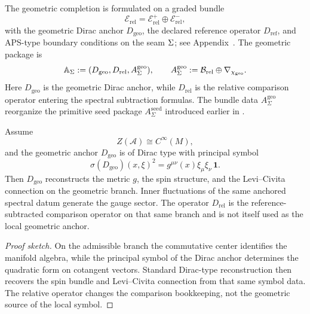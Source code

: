 The geometric completion is formulated on a graded bundle
\[
\mathcal E_{\mathrm{rel}}=\mathcal E_{\mathrm{rel}}^+\oplus\mathcal E_{\mathrm{rel}}^-,
\]
with the geometric Dirac anchor $D_{\mathrm{geo}}$, the declared reference operator
$D_{\mathrm{ref}}$, and APS-type boundary conditions on the seam $\Sigma$; see
Appendix~. The geometric package is
\[
\mathbb A_{\Sigma}:=(D_{\mathrm{geo}},D_{\mathrm{rel}},A_{\Sigma}^{\mathrm{geo}}),
\qquad
A_{\Sigma}^{\mathrm{geo}}:=\mathcal B_{\mathrm{rel}}\oplus\nabla_{\chi_{\mathrm{geo}}}.
\]
Here $D_{\mathrm{geo}}$ is the geometric Dirac anchor, while $D_{\mathrm{rel}}$ is the relative comparison operator entering the spectral subtraction formulas. The bundle data $A_{\Sigma}^{\mathrm{geo}}$ reorganize the primitive seed package $A_{\Sigma}^{\mathrm{seed}}$ introduced earlier in .
\begin{theorem}
\label{thm:geometric-reconstruction-anchor}
\label{thm:geometric-reconstruction-from-Dgeo}
\label{thm:relative-geometric-reconstruction}
Assume
\[
Z(\mathcal A)\cong C^\infty(M),
\]
and the geometric anchor $D_{\mathrm{geo}}$ is of Dirac type with principal symbol
\[
\sigma(D_{\mathrm{geo}})(x,\xi)^2
=
g^{\mu\nu}(x)\xi_\mu\xi_\nu\,\mathbf 1.
\]
Then $D_{\mathrm{geo}}$ reconstructs the metric $g$, the spin structure, and the
Levi--Civita connection on the geometric branch. Inner fluctuations of the same anchored
spectral datum generate the gauge sector.
The operator $D_{\mathrm{rel}}$ is the reference-subtracted comparison operator on that
same branch and is not itself used as the local geometric anchor.
\end{theorem}

\begin{proof}[Proof sketch]
On the admissible branch the commutative center identifies the manifold algebra, while the
principal symbol of the Dirac anchor determines the quadratic form on cotangent vectors.
Standard Dirac-type reconstruction then recovers the spin bundle and Levi--Civita connection
from that same symbol data. The relative operator changes the comparison bookkeeping, not the
geometric source of the local symbol.
\end{proof}

